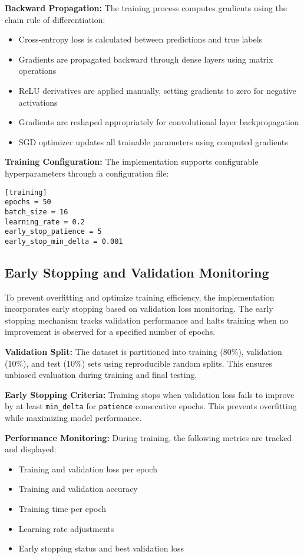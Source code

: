 \documentclass[conference]{IEEEtran}
\begin{document}
\textbf{Backward Propagation:} The training process computes gradients using the chain rule of differentiation:
\begin{itemize}
\item Cross-entropy loss is calculated between predictions and true labels
\item Gradients are propagated backward through dense layers using matrix operations
\item ReLU derivatives are applied manually, setting gradients to zero for negative activations
\item Gradients are reshaped appropriately for convolutional layer backpropagation
\item SGD optimizer updates all trainable parameters using computed gradients
\end{itemize}

\textbf{Training Configuration:} The implementation supports configurable hyperparameters through a configuration file:
\begin{verbatim}
[training]
epochs = 50
batch_size = 16
learning_rate = 0.2
early_stop_patience = 5
early_stop_min_delta = 0.001
\end{verbatim}

\subsection{Early Stopping and Validation Monitoring}
To prevent overfitting and optimize training efficiency, the implementation incorporates early stopping based on validation loss monitoring. The early stopping mechanism tracks validation performance and halts training when no improvement is observed for a specified number of epochs.

\textbf{Validation Split:} The dataset is partitioned into training (80\%), validation (10\%), and test (10\%) sets using reproducible random splits. This ensures unbiased evaluation during training and final testing.

\textbf{Early Stopping Criteria:} Training stops when validation loss fails to improve by at least \texttt{min\_delta} for \texttt{patience} consecutive epochs. This prevents overfitting while maximizing model performance.

\textbf{Performance Monitoring:} During training, the following metrics are tracked and displayed:
\begin{itemize}
\item Training and validation loss per epoch
\item Training and validation accuracy
\item Training time per epoch
\item Learning rate adjustments
\item Early stopping status and best validation loss
\end{itemize}
\end{document}
